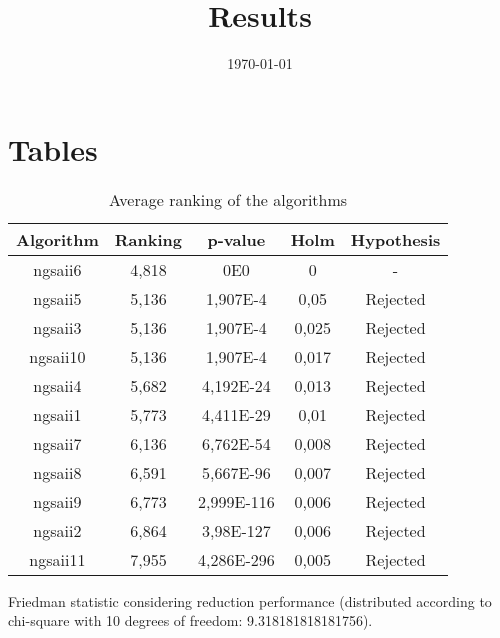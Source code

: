 \documentclass{article}
\title{Results}
\author{}
\date{\today}
\begin{document}
\oddsidemargin 0in \topmargin 0in\maketitle

\section{Tables}
\begin{table}[!htp]
\centering
\begin{tabular}{c|c|c|c|c}
Algorithm&Ranking&p-value&Holm&Hypothesis\\
\hline
ngsaii6 & 4,818 & 0E0 & 0 & -\\
ngsaii5 & 5,136 & 1,907E-4 & 0,05 & Rejected\\
ngsaii3 & 5,136 & 1,907E-4 & 0,025 & Rejected\\
ngsaii10 & 5,136 & 1,907E-4 & 0,017 & Rejected\\
ngsaii4 & 5,682 & 4,192E-24 & 0,013 & Rejected\\
ngsaii1 & 5,773 & 4,411E-29 & 0,01 & Rejected\\
ngsaii7 & 6,136 & 6,762E-54 & 0,008 & Rejected\\
ngsaii8 & 6,591 & 5,667E-96 & 0,007 & Rejected\\
ngsaii9 & 6,773 & 2,999E-116 & 0,006 & Rejected\\
ngsaii2 & 6,864 & 3,98E-127 & 0,006 & Rejected\\
ngsaii11 & 7,955 & 4,286E-296 & 0,005 & Rejected\\
\end{tabular}
\caption{Average ranking of the algorithms}
\end{table}


Friedman statistic considering reduction performance (distributed according to chi-square with 10 degrees of freedom: 9.318181818181756).
\end{document}

